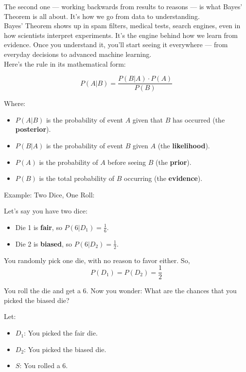 \documentclass{book}
\begin{document}
The second one — working backwards from results to reasons — is what Bayes’ Theorem is all about. It’s how we go from data to understanding.\\

Bayes’ Theorem shows up in spam filters, medical tests, search engines, even in how scientists interpret experiments. It’s the engine behind how we learn from evidence. Once you understand it, you’ll start seeing it everywhere — from everyday decisions to advanced machine learning.\\

Here’s the rule in its mathematical form:

\[
P(A|B) = \frac{P(B|A) \cdot P(A)}{P(B)}
\]

Where:
\begin{itemize}
  \item $P(A|B)$ is the probability of event $A$ given that $B$ has occurred (the \textbf{posterior}).
  \item $P(B|A)$ is the probability of event $B$ given $A$ (the \textbf{likelihood}).
  \item $P(A)$ is the probability of $A$ before seeing $B$ (the \textbf{prior}).
  \item $P(B)$ is the total probability of $B$ occurring (the \textbf{evidence}).
\end{itemize}

\newpage

Example: Two Dice, One Roll:

Let’s say you have two dice:
\begin{itemize}
  \item Die 1 is \textbf{fair}, so $P(6|D_1) = \frac{1}{6}$.
  \item Die 2 is \textbf{biased}, so $P(6|D_2) = \frac{1}{2}$.
\end{itemize}

You randomly pick one die, with no reason to favor either. So,
\[
P(D_1) = P(D_2) = \frac{1}{2}
\]

You roll the die and get a 6. Now you wonder: What are the chances that you picked the biased die?

Let:
\begin{itemize}
  \item $D_1$: You picked the fair die.
  \item $D_2$: You picked the biased die.
  \item $S$: You rolled a 6.
\end{itemize}
\end{document}
